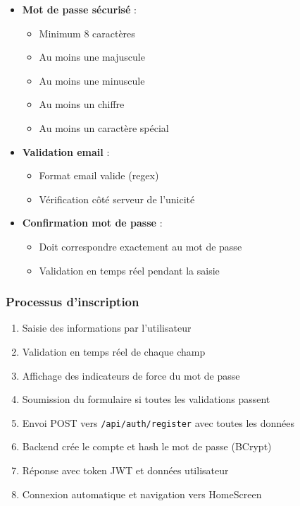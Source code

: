 \documentclass[a4paper,11pt]{report}
\begin{document}
\begin{itemize}
    \item \textbf{Mot de passe sécurisé} :
    \begin{itemize}
        \item Minimum 8 caractères
        \item Au moins une majuscule
        \item Au moins une minuscule
        \item Au moins un chiffre
        \item Au moins un caractère spécial
    \end{itemize}
    
    \item \textbf{Validation email} :
    \begin{itemize}
        \item Format email valide (regex)
        \item Vérification côté serveur de l'unicité
    \end{itemize}
    
    \item \textbf{Confirmation mot de passe} :
    \begin{itemize}
        \item Doit correspondre exactement au mot de passe
        \item Validation en temps réel pendant la saisie
    \end{itemize}
\end{itemize}

\subsubsection{Processus d'inscription}

\begin{enumerate}
    \item Saisie des informations par l'utilisateur
    \item Validation en temps réel de chaque champ
    \item Affichage des indicateurs de force du mot de passe
    \item Soumission du formulaire si toutes les validations passent
    \item Envoi POST vers \texttt{/api/auth/register} avec toutes les données
    \item Backend crée le compte et hash le mot de passe (BCrypt)
    \item Réponse avec token JWT et données utilisateur
    \item Connexion automatique et navigation vers HomeScreen
\end{enumerate}
\end{document}
